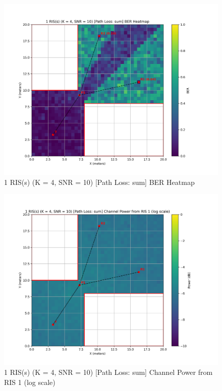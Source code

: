 \begin{figure}[H]
  \centering
  \includegraphics[width=0.8\linewidth]{imgs/heatmap-simulations/1 RIS(s) (K = 4, SNR = 10) [Path Loss_ sum] BER Heatmap.png}
  \caption{1 RIS(s) (K = 4, SNR = 10) [Path Loss: sum] BER Heatmap}
\end{figure}

\begin{figure}[H]
  \centering
  \includegraphics[width=0.8\linewidth]{imgs/heatmap-simulations/1 RIS(s) (K = 4, SNR = 10) [Path Loss_ sum] Channel Power from RIS 1 (log scale).png}
  \caption{1 RIS(s) (K = 4, SNR = 10) [Path Loss: sum] Channel Power from RIS 1 (log scale)}
\end{figure}

